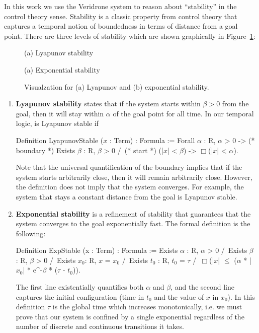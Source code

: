 \documentclass[preprint,nocopyrightspace]{sigplanconf}
\begin{document}
In this work we use the Veridrone system to reason about ``stability'' in the control theory sense.
Stability is a classic property from control theory that captures a temporal notion of boundedness in terms of distance from a goal point.
There are three levels of stability which are shown graphically in Figure~\ref{fig:stability}:


\begin{figure}[!h]
  \centering
  \resizebox{\linewidth}{0.8\linewidth}{}

  (a) Lyapunov stability

  \resizebox{\linewidth}{0.8\linewidth}{}

  (a) Exponential stability

  \caption{Visualzation for (a) Lyapunov and (b) exponential stability.}
  \label{fig:stability}
\end{figure}


\begin{enumerate}
\item \textbf{Lyapunov stability} states that if the system starts within $\beta > 0$ from the goal, then it will stay within $\alpha$ of the goal point for all time.
In our temporal logic,  is Lyapunov stable if
\begin{coq}
Definition LyapunovStable ($x$ : Term) : Formula :=
  Forall $\alpha$ : R, $\alpha$ > 0 -> (* boundary *)
    Exists $\beta$ : R, $\beta$ > 0 /\ (* start *)
      (|$x$| < $\beta$) -> $\Box$(|$x$| < $\alpha$).
\end{coq}
Note that the universal quantification of the boundary implies that if the system starts arbitrarily close, then it will remain arbitrarily close.
However, the definition does not imply that the system converges.
For example, the system that stays a constant distance from the goal is Lyapunov stable.


\item \textbf{Exponential stability} is a refinement of stability that guarantees that the system converges to the goal exponentially fast.
The formal definition is the following:
\begin{coq}
Definition ExpStable (x : Term) : Formula :=
  Exists $\alpha$ : R, $\alpha$ > 0 /\ Exists $\beta$ : R, $\beta$ > 0 /\
  Exists $x_0$: R, $x$ = $x_0$ /\ Exists $t_0$ : R, $t_0$ = $\tau$ /\
     $\Box$(|$x$| $\leq$ ($\alpha$ * |$x_0$| * e^{-$\beta$ * ($\tau$ - $t_0$)}).
\end{coq}
The first line existentially quantifies both $\alpha$ and $\beta$, and the second line captures the initial configuration (time in $t_0$ and the value of $x$ in $x_0$).
In this definition $\tau$ is the global time which increases monotonically, i.e. we must prove that our system is confined by a single exponential regardless of the number of discrete and continuous transitions it takes.

\end{enumerate}
\end{document}
